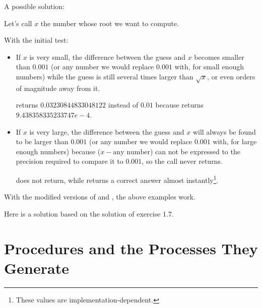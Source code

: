 \begin{exe} %
    A possible solution:

    Let's call $x$ the number whose root we want to compute.

    With the initial  test:
    \begin{itemize}
        \item If $x$ is very small, the difference between the guess and $x$ 
        becomes smaller than $0.001$ (or any number we would replace $0.001$ 
        with, for small enough numbers) while the guess is still several times 
        larger than $\sqrt{x}$, or even orders of magnitude away from it.
        \begin{example}
             returns $0.03230844833048122$ instead of $0.01$ 
            because\linebreak
            returns\linebreak
            $9.438358335233747e-4$.
        \end{example}
    \item If $x$ is very large, the difference between the guess and $x$ will 
        always be found to be larger than $0.001$ (or any number we would 
        replace $0.001$ with, for large enough numbers) because
        ($x - \text{any number}$) can not be expressed to the precision required 
        to compare it to $0.001$, so the call never returns.
        \begin{example}
             does not return, while  
            returns a correct answer almost instantly\footnote{These values are 
            implementation-dependent.}.
        \end{example}
    \end{itemize}

    With the modified versions of  and , the 
    above examples work.
\end{exe}

\begin{exe} %
    Here is a solution based on the solution of exercise 1.7.
\end{exe}

\section{Procedures and the Processes They Generate}

